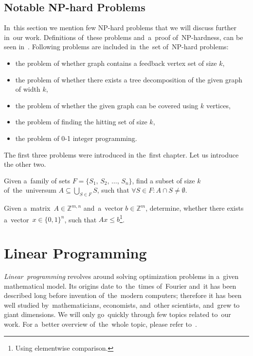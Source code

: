 \section{Notable NP-hard Problems}
In~this section we mention few NP-hard problems that we will discuss further in~our work. Definitions of~these problems and~a~proof of~NP-hardness, can be seen in~\cite{Diestel, Arora, Karp}.
Following problems are included in~the~set of~NP-hard problems:
\begin{itemize}
    \item the problem of whether graph contains a feedback vertex set of size $k$,
    \item the problem of whether there exists a tree decomposition of the given graph of width $k$,
    \item the problem of whether the given graph can be covered using $k$ vertices,
    \item the problem of finding the hitting set of size $k$,
    \item the problem of 0-1 integer programming.
\end{itemize}
The first three problems were introduced in the~first chapter. Let us introduce the other two.
\begin{definition}
    Given a~family of sets $F = \{S_1,\,S_2,\,\dots,\,S_n\}$, find a subset of size $k$ of~the~universum $A \subseteq \bigcup_{S \in F} S$, such that $\forall S \in F: A \cap S \neq \emptyset$.
\end{definition}
\begin{definition}
    Given a~matrix~${A \in \mathbb{Z}^{m,n}}$ and~a~vector $b \in \mathbb{Z}^m$, determine, whether there exists a~vector~$x \in \{0, 1\}^n$, such that $Ax \leq b$\footnote{Using elementwise comparison.}.
\end{definition}

\chapter{Linear Programming}
\emph{Linear~programming} revolves around solving optimization problems in a~given mathematical model. Its origins date to~the~times of~Fourier and~it has been described long before invention of~the~modern computers; therefore it has been well studied by~mathematicians, economists, and~other scientists, and~grew to giant dimensions. We will only go~quickly through few topics related to~our work. For a~better overview of~the~whole topic, please refer to~\cite{Sierksma}.
